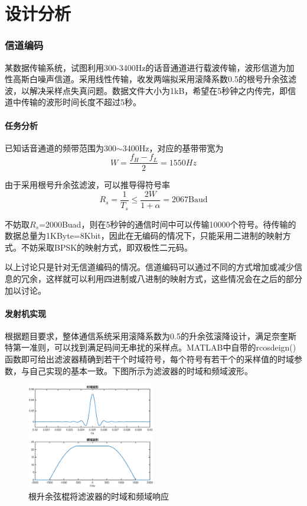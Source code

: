\part{设计分析}

\section{信道编码}

某数据传输系统，试图利用300-3400Hz的话音通道进行载波传输，波形信道为加性高斯白噪声信道。采用线性传输，收发两端拟采用滚降系数0.5的根号升余弦滤波，以解决采样点失真问题。数据文件大小为1kB，希望在5秒钟之内传完，即信道中传输的波形时间长度不超过5秒。
    
\subsection{任务分析}

已知话音通道的频带范围为300$\sim$3400Hz，对应的基带带宽为
\begin{equation*}
W=\frac{f_H-f_L}{2}=1550Hz
\end{equation*}

由于采用根号升余弦滤波，可以推导得符号率
\begin{equation*}
R_s=\frac{1}{T_s}\leq\frac{2W}{1+\alpha}=2067\text{Baud}
\end{equation*}

不妨取$R_s$=2000Buad，则在5秒钟的通信时间中可以传输10000个符号。待传输的数据总量为1KByte=8Kbit，因此在无编码的情况下，只能采用二进制的映射方式。不妨采取BPSK的映射方式，即双极性二元码。

以上讨论只是针对无信道编码的情况。信道编码可以通过不同的方式增加或减少信息的冗余，这样就可以利用四进制或八进制的映射方式，这些情况会在之后的部分加以讨论。

\subsection{发射机实现}

根据题目要求，整体通信系统采用滚降系数为0.5的升余弦滚降设计，满足奈奎斯特第一准则，可以找到满足码间无串扰的采样点。MATLAB中自带的rcosdeign()函数即可给出滤波器精确到若干个时域符号，每个符号有若干个的采样值的时域参数，与自己实现的基本一致。下图所示为滤波器的时域和频域波形。

\begin{figure}[h]
    \centering
    \includegraphics[width=0.5\textwidth]{./pic/rcos_fir.eps}
    \caption{根升余弦棍将滤波器的时域和频域响应}
\end{figure}

